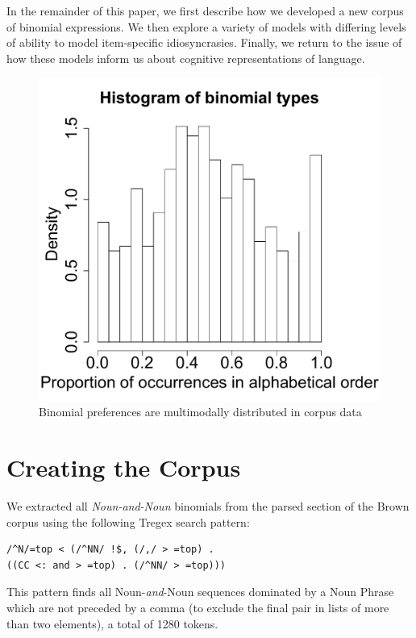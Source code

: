 \documentclass[10pt,letterpaper]{article}
\begin{document}
In the remainder of this paper, we first describe how we developed a new corpus of binomial expressions. We then explore a variety of models with differing levels of ability to model item-specific idiosyncrasies. Finally, we return to the issue of how these models inform us about cognitive representations of language.

\begin{figure}[h]
\centering
\includegraphics[scale=.3]{corpus-hist.pdf}
\vspace{-10pt}
\caption{Binomial preferences are multimodally distributed in corpus data}
\label{fig:corpus-hist}
\end{figure}


\section{Creating the Corpus} \label{corpus}
We extracted all \emph{Noun-and-Noun} binomials from the parsed section of the Brown corpus \citep{Treebank:tt} using the following Tregex \citep{Levy:2006us} search pattern:
\begin{verbatim}/^N/=top < (/^NN/ !$, (/,/ > =top) .
((CC <: and > =top) . (/^NN/ > =top)))\end{verbatim}
This pattern finds all Noun-\emph{and}-Noun sequences dominated by a Noun Phrase which are not preceded by a comma (to exclude the final pair in lists of more than two elements), a total of 1280 tokens.
\end{document}
